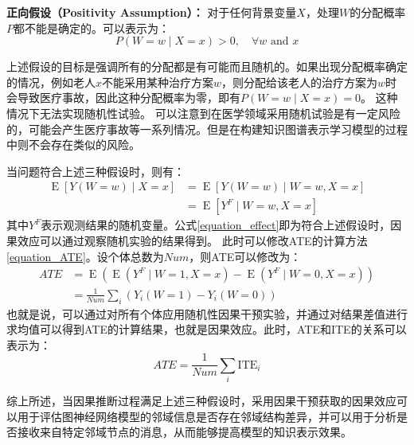 \documentclass[algorithmlist, AutoFakeBold, AutoFakeSlant, figurelist, tablelist, nomlist, engineering]{seuthesix}
\begin{document}
\begin{assumption}
  \textbf{正向假设（Positivity Assumption）：}
  对于任何背景变量$X$，处理$W$的分配概率$P$都不能是确定的。可以表示为：
  \begin{equation}
    P(W=w \mid X=x)>0, \quad \forall w \text { and } x
  \end{equation}
  \label{3_Assumption}
\end{assumption}
上述假设的目标是强调所有的分配都是有可能而且随机的。如果出现分配概率确定的情况，例如老人$x$不能采用某种治疗方案$w$，则分配给该老人的治疗方案为$w$时会导致医疗事故，因此这种分配概率为零，即有$P(W=w \mid X=x) = 0$。
这种情况下无法实现随机性试验。
可以注意到在医学领域采用随机试验是有一定风险的，可能会产生医疗事故等一系列情况。但是在构建知识图谱表示学习模型的过程中则不会存在类似的风险。

当问题符合上述三种假设时，则有：
\begin{equation}
  \begin{aligned}
  \operatorname{E}[Y(W=w) \mid X=x] & =\operatorname{E}[Y(W=w) \mid W=w, X=x] \\
  & =\operatorname{E}\left[Y^F \mid W=w, X=x\right]
  \end{aligned}
  \label{equation_effect}
\end{equation}
其中$Y^F$表示观测结果的随机变量。公式\ref{equation_effect}即为符合上述假设时，因果效应可以通过观察随机实验的结果得到。
此时可以修改ATE的计算方法\ref{equation_ATE}。设个体总数为$Num$，则ATE可以修改为：
\begin{equation}
  \begin{aligned}
  ATE & =\operatorname{E}\left(\operatorname{E}\left(Y^F \mid W=1, X=x\right)-\operatorname{E}\left(Y^F \mid W=0, X=x\right)\right) \\
  & =\frac{1}{Num} \sum_i\left(Y_i(W=1)-Y_i(W=0)\right)
  \end{aligned}
  \label{equation_newATE}
\end{equation}
也就是说，可以通过对所有个体应用随机性因果干预实验，并通过对结果差值进行求均值可以得到ATE的计算结果，也就是因果效应。此时，ATE和ITE的关系可以表示为：
\begin{equation}
  ATE = \frac{1}{Num} \sum_i \mathrm{ITE}_i
  \label{equation_ATEandITE}
\end{equation}

综上所述，当因果推断过程满足上述三种假设时，采用因果干预获取的因果效应可以用于评估图神经网络模型的邻域信息是否存在邻域结构差异，并可以用于分析是否接收来自特定邻域节点的消息，从而能够提高模型的知识表示效果。
\end{document}
